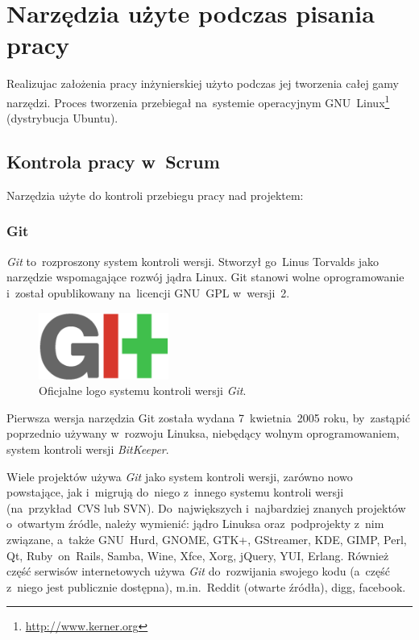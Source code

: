 \section{Narzędzia użyte podczas pisania pracy} \label{narzedzia}

Realizujac założenia pracy inżynierskiej użyto podczas jej tworzenia całej gamy narzędzi. Proces tworzenia przebiegał na~systemie operacyjnym GNU~Linux\footnote{\url{http://www.kerner.org}} (dystrybucja Ubuntu\cite{ubuntu}).

\subsection{Kontrola pracy w~Scrum}

Narzędzia użyte do kontroli przebiegu pracy nad projektem:

\subsubsection{Git}

\textit{Git}\cite{git} to~rozproszony system kontroli wersji. Stworzył go~Linus Torvalds jako narzędzie wspomagające rozwój jądra Linux. Git stanowi wolne oprogramowanie i~został opublikowany na~licencji GNU~GPL w~wersji~2.

\begin{figure}
  \begin{center}
    \includegraphics[width=0.38\textwidth]{obrazki/git_logo.png}
  \end{center}
  \caption{Oficjalne logo systemu kontroli wersji \textit{Git}.}
\end{figure}

Pierwsza wersja narzędzia Git została wydana 7~kwietnia~2005 roku, by~zastąpić poprzednio używany w~rozwoju Linuksa, niebędący wolnym oprogramowaniem, system kontroli wersji \textit{BitKeeper}.


Wiele projektów używa \textit{Git} jako system kontroli wersji, zarówno nowo powstające, jak i~migrują do~niego z~innego systemu kontroli wersji (na~przykład~CVS lub SVN). Do~największych i~najbardziej znanych projektów o~otwartym źródle, należy wymienić: jądro Linuksa oraz~podprojekty z~nim związane, a~także GNU~Hurd, GNOME, GTK+, GStreamer, KDE, GIMP, Perl, Qt, Ruby~on~Rails, Samba, Wine, Xfce, Xorg, jQuery, YUI, Erlang. Również część serwisów internetowych używa \textit{Git} do~rozwijania swojego kodu (a~część z~niego jest publicznie dostępna), m.in.~Reddit (otwarte źródła), digg, facebook.


